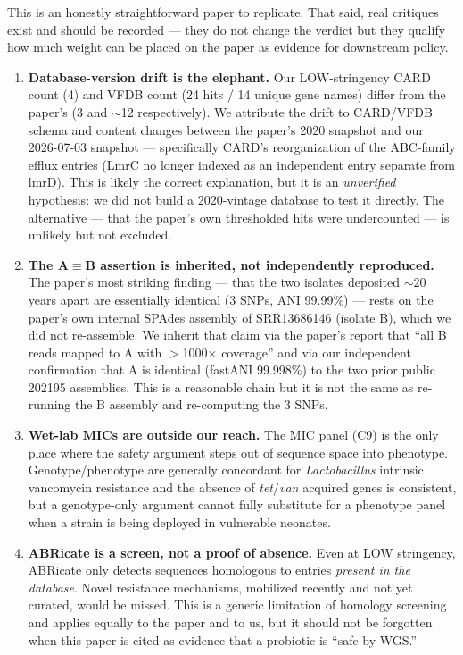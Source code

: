 \documentclass[11pt,letterpaper]{article}
\begin{document}
This is an honestly straightforward paper to replicate. That said, real critiques exist and
should be recorded --- they do not change the verdict but they qualify how much weight can be
placed on the paper as evidence for downstream policy.

\begin{enumerate}
\item \textbf{Database-version drift is the elephant.} Our LOW-stringency CARD count (4) and
      VFDB count (24 hits / 14 unique gene names) differ from the paper's (3 and $\sim$12
      respectively). We attribute the drift to CARD/VFDB schema and content changes between the
      paper's 2020 snapshot and our 2026-07-03 snapshot --- specifically CARD's reorganization
      of the ABC-family efflux entries (LmrC no longer indexed as an independent entry separate
      from lmrD). This is likely the correct explanation, but it is an \textit{unverified}
      hypothesis: we did not build a 2020-vintage database to test it directly. The alternative
      --- that the paper's own thresholded hits were undercounted --- is unlikely but not
      excluded.

\item \textbf{The A$\equiv$B assertion is inherited, not independently reproduced.} The paper's
      most striking finding --- that the two isolates deposited ${\sim}20$ years apart are
      essentially identical (3 SNPs, ANI 99.99\%) --- rests on the paper's own internal
      SPAdes assembly of SRR13686146 (isolate B), which we did not re-assemble. We inherit
      that claim via the paper's report that ``all B reads mapped to A with $>$1000$\times$
      coverage'' and via our independent confirmation that A is identical (fastANI 99.998\%)
      to the two prior public 202195 assemblies. This is a reasonable chain but it is not the
      same as re-running the B assembly and re-computing the 3 SNPs.

\item \textbf{Wet-lab MICs are outside our reach.} The MIC panel (C9) is the only place where
      the safety argument steps out of sequence space into phenotype. Genotype/phenotype are
      generally concordant for \textit{Lactobacillus} intrinsic vancomycin resistance and the
      absence of \textit{tet}/\textit{van} acquired genes is consistent, but a genotype-only
      argument cannot fully substitute for a phenotype panel when a strain is being deployed
      in vulnerable neonates.

\item \textbf{ABRicate is a screen, not a proof of absence.} Even at LOW stringency, ABRicate
      only detects sequences homologous to entries \textit{present in the database}. Novel
      resistance mechanisms, mobilized recently and not yet curated, would be missed. This is
      a generic limitation of homology screening and applies equally to the paper and to us,
      but it should not be forgotten when this paper is cited as evidence that a probiotic is
      ``safe by WGS.''


\end{enumerate}
\end{document}
